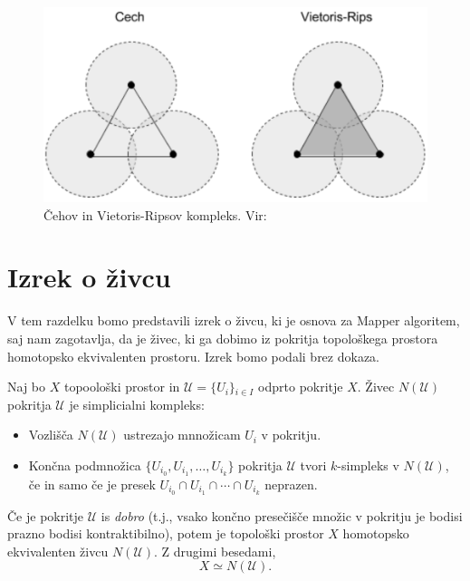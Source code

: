 \begin{figure}[H]
  \centering
  \includegraphics[width=0.7\linewidth]{resources/cech-vs-vietoris-rips-complex.png}
  \caption{Čehov in Vietoris-Ripsov kompleks. Vir:~\cite{justinmath_persistent_homology}}\label{fig:backprop2}
\end{figure}

\section{Izrek o živcu}
V tem razdelku bomo predstavili izrek o živcu, ki je osnova za Mapper algoritem, saj nam zagotavlja, da je živec, ki ga dobimo iz pokritja topološkega prostora homotopsko ekvivalenten prostoru. Izrek bomo podali brez dokaza.~\cite{GuzeljBlatnik2020}

\begin{izrek}
  Naj bo \( X \) topoološki prostor in \( \mathcal{U} = \{ U_i \}{}_{i \in I} \) odprto pokritje \( X \). Živec \( N(\mathcal{U}) \) pokritja \( \mathcal{U} \) je simplicialni kompleks:
  \begin{itemize}
    \item Vozlišča \( N(\mathcal{U}) \) ustrezajo mnnožicam \( U_i \) v pokritju.
    \item Končna podmnožica \( \{ U_{i_0}, U_{i_1}, \ldots, U_{i_k} \} \) pokritja \( \mathcal{U} \) tvori \( k \)-simpleks v \( N(\mathcal{U}) \), če in samo če je presek \( U_{i_0} \cap U_{i_1} \cap \cdots \cap U_{i_k} \) neprazen.
  \end{itemize}
  Če je pokritje \( \mathcal{U} \) is \textit{dobro} (t.j., vsako končno presečišče množic v pokritju je bodisi prazno bodisi kontraktibilno), potem je topološki prostor \( X \) homotopsko ekvivalenten živcu \( N(\mathcal{U}) \). Z drugimi besedami,
  \[ X \simeq N(\mathcal{U}). \]
\end{izrek}